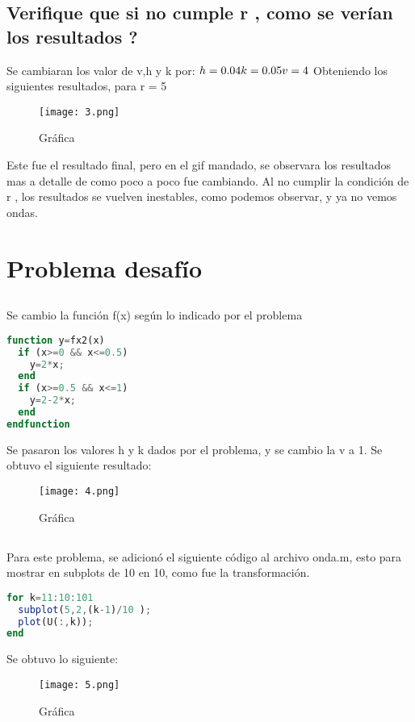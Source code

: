 \documentclass{article}
\begin{document}
\subsection{Verifique que si no cumple r , como se verían los resultados ?}
Se cambiaran los valor de v,h y k por:
$
h = 0.04\\
k = 0.05\\
v = 4\\
$
Obteniendo los siguientes resultados, para r = 5
\begin{figure}[H]
    \centering
    \texttt{[image: 3.png]}
    \caption{Gráfica}
\end{figure}
Este fue el resultado final, pero en el gif mandado, se observara los resultados mas a detalle de como poco a poco fue cambiando. Al no cumplir la condición de r , los resultados se vuelven inestables, como podemos observar, y ya no vemos ondas.

\section{Problema desafío}
\subsection{}
Se cambio la función f(x) según lo indicado por el problema
\begin{lstlisting}[language=octave,caption=fx2.m]
function y=fx2(x)
  if (x>=0 && x<=0.5)
    y=2*x;
  end
  if (x>=0.5 && x<=1)
    y=2-2*x;
  end
endfunction
\end{lstlisting}
Se pasaron los valores h y k dados por el problema, y se cambio la v a 1. Se obtuvo el siguiente resultado:
\begin{figure}[H]
    \centering
    \texttt{[image: 4.png]}
    \caption{Gráfica}
\end{figure}
\subsection{}
Para este problema, se adicionó el siguiente código al archivo onda.m, esto para mostrar en subplots de 10 en 10, como fue la transformación.
\begin{lstlisting}[language=octave,caption=onda.m]
for k=11:10:101
  subplot(5,2,(k-1)/10 );
  plot(U(:,k));
end
\end{lstlisting}
Se obtuvo lo siguiente:
\begin{figure}[H]
    \centering
    \texttt{[image: 5.png]}
    \caption{Gráfica}
\end{figure}
\end{document}

